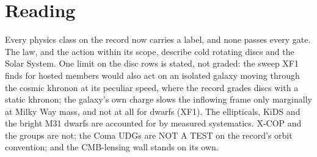 \documentclass[10pt]{article}
\begin{document}
\section{Reading}\label{sec:reading}
Every physics class on the record now carries a label, and none passes every gate.
The law, and the action within its scope, describe cold rotating discs and the Solar System.
One limit on the disc rows is stated, not graded: the sweep XF1 finds for hosted members would also act on an isolated galaxy moving through the cosmic khronon at its peculiar speed, where the record grades discs with a static khronon; the galaxy's own charge slows the inflowing frame only marginally at Milky Way mass, and not at all for dwarfs (XF1).
The ellipticals, KiDS and the bright M31 dwarfs are accounted for by measured systematics.
X-COP and the groups are not; the Coma UDGs are NOT A TEST on the record's orbit convention; and the CMB-lensing wall stands on its own.
\end{document}
